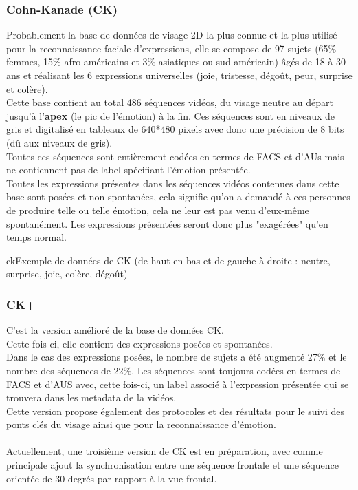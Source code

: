 \documentclass[overfullbox, poster]{polytech/polytech}
\begin{document}
\subsubsection{Cohn-Kanade (CK) \cite{ck}}
Probablement la base de données de visage 2D la plus connue et la plus utilisé pour la reconnaissance faciale d'expressions, elle se compose de 97 sujets (65\% femmes, 15\% afro-américains et 3\% asiatiques ou sud américain) âgés de 18 à 30 ans et réalisant les 6 expressions universelles (joie, tristesse, dégoût, peur, surprise et colère).\\
Cette base contient au total 486 séquences vidéos, du visage neutre au départ jusqu'à l'\textbf{apex} (le pic de l'émotion) à la fin. Ces séquences sont en niveaux de gris et digitalisé en tableaux de 640*480 pixels avec donc une précision de 8 bits (dû aux niveaux de gris).\\
Toutes ces séquences sont entièrement codées en termes de FACS et d'AUs mais ne contiennent pas de label spécifiant l'émotion présentée.\\
Toutes les expressions présentes dans les séquences vidéos contenues dans cette base sont posées et non spontanées, cela signifie qu'on a demandé à ces personnes de produire telle ou telle émotion, cela ne leur est pas venu d'eux-même spontanément. Les expressions présentées seront donc plus "exagérées" qu'en temps normal.

\begin{Figure}{ck}{Exemple de données de CK (de haut en bas et de gauche à droite : neutre, surprise, joie, colère, dégoût)}
\end{Figure}

\subsubsection{CK+ \cite{ckplus}}
C'est la version amélioré de la base de données CK.\\
Cette fois-ci, elle contient des expressions posées et spontanées.\\
Dans le cas des expressions posées, le nombre de sujets a été augmenté 27\% et le nombre des séquences de 22\%.
Les séquences sont toujours codées en termes de FACS et d'AUS avec, cette fois-ci, un label associé à l'expression présentée qui se trouvera dans les metadata de la vidéos.\\
Cette version propose également des protocoles et des résultats pour le suivi des ponts clés du visage ainsi que pour la reconnaissance d'émotion.\\
\\
Actuellement, une troisième version de CK est en préparation, avec comme principale ajout la synchronisation entre une séquence frontale et une séquence orientée de 30 degrés par rapport à la vue frontal.
\end{document}

